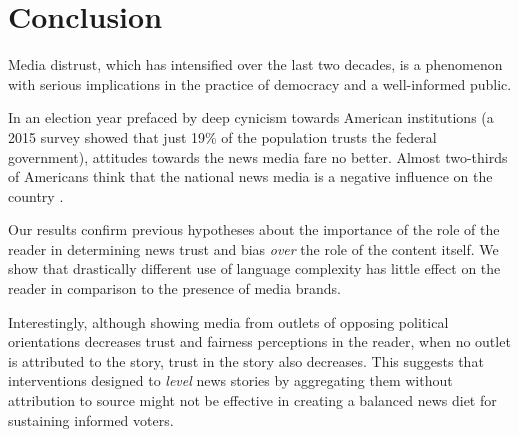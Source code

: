 \chapter{Conclusion}
Media distrust, which has intensified over the last two decades, is a phenomenon with serious implications in the practice of democracy and a well-informed public.  

In an election year prefaced by deep cynicism towards American institutions (a 2015 survey showed that just 19\% of the population trusts the federal government), attitudes towards the news media fare no better. Almost two-thirds of Americans think that the national news media is a negative influence on the country \cite{beyond-distrust}. 

Our results confirm previous hypotheses about the importance of the role of the reader in determining news trust and bias \emph{over} the role of the content itself. We show that drastically different use of language complexity has little effect on the reader in comparison to the presence of media brands.

Interestingly, although showing media from outlets of opposing political orientations decreases trust and fairness perceptions in the reader, when no outlet is attributed to the story, trust in the story also decreases. This suggests that interventions designed to \emph{level} news stories by aggregating them without attribution to source might not be effective in creating a balanced news diet for sustaining informed voters. 